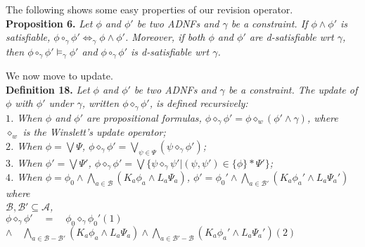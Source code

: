 \documentclass{llncs}
\begin{document}
The following shows some easy properties of our revision operator.\vspace{0.05in}\\
\textbf{Proposition 6.} \textit{Let $\phi$ and $\phi'$ be two ADNFs and $\gamma$ be a constraint. If $\phi\land\phi'$ is satisfiable, $\phi\circ_\gamma\phi'\Leftrightarrow_\gamma\phi\land\phi'$. Moreover, if both $\phi$ and $\phi'$ are d-satisfiable wrt $\gamma$, then $\phi\circ_\gamma\phi'\models_\gamma\phi'$ and $\phi\circ_\gamma\phi'$ is d-satisfiable wrt $\gamma$.}\vspace{0.05in}

We now move to update.\\
\textbf{Definition 18.} \textit{Let $\phi$ and $\phi'$ be two ADNFs and $\gamma$ be a constraint. The update of $\phi$ with $\phi'$ under $\gamma$, written $\phi\diamond_\gamma\phi'$, is defined recursively:\\
\hspace*{0.1in} $1$. When $\phi$ and $\phi'$ are propositional formulas, $\phi\diamond_\gamma\phi'=\phi\diamond_w(\phi'\land\gamma)$, where \\
\hspace*{0.1in}\hspace{0.17in} $\diamond_w$ is the Winslett's update operator\cite{winslett1988reasoning};\\
\hspace*{0.1in} $2$. When $\phi=\bigvee\Psi$, $\phi\diamond_\gamma\phi'=\bigvee_{\psi\in\Psi}(\psi\diamond_\gamma\phi')$;\\
\hspace*{0.1in} $3$. When $\phi'=\bigvee\Psi'$, $\phi\diamond_\gamma\phi'=\bigvee\{\psi\diamond_\gamma\psi'|(\psi, \psi')\in\{\phi\}*\Psi'\}$;\\
\hspace*{0.1in} $4$. When $\phi=\phi_0\land\bigwedge_{a\in\mathcal{B}}(K_a\phi_a\land L_a\Psi_a)$,  $\phi'=\phi_0'\land\bigwedge_{a\in\mathcal{B}'}(K_a\phi_a'\land L_a\Psi_a')$ where\\
\hspace*{0.1in}\hspace{0.2in} $\mathcal{B}, \mathcal{B}'\subseteq\mathcal{A}$, \\
\hspace*{0.1in}\hspace{0.2in} $\phi\diamond_\gamma\phi'\quad=\quad\phi_0\diamond_\gamma\phi_0'$\hspace{3in}$(1)$\\
\hspace*{0.1in}\hspace{0.75in} $\land\quad\bigwedge_{a\in\mathcal{B}-\mathcal{B}'}(K_a\phi_a\land L_a\Psi_a)\land\bigwedge_{a\in\mathcal{B}'-\mathcal{B}}(K_a\phi_a'\land L_a\Psi_a')$\hspace{0.5in}$(2)$\\
}
\end{document}

